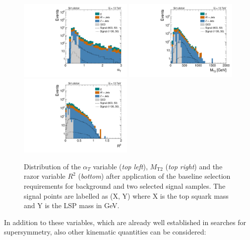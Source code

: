 \begin{figure}[!t]
  \centering
  \begin{minipage}[c]{1.\textwidth}
    \begin{center}
      \includegraphics[width=0.49\textwidth]{figures/Stop_DeltaPhiSelection_AlphaT.pdf}  
      \includegraphics[width=0.49\textwidth]{figures/Stop_DeltaPhiSelection_MT2.pdf} \\
      \includegraphics[width=0.49\textwidth]{figures/Stop_DeltaPhiSelection_Razor_R.pdf}
    \end{center}
  \end{minipage}

  \caption{Distribution of the $\alpha_T$ variable (\textit{top left}), $M_\mathrm{T2}$ (\textit{top right}) and  the razor variable $R^2$ (\textit{bottom}) after application of the baseline selection requirements for background and two selected signal samples. The signal points are labelled as (X, Y) where X is the top squark mass and Y is the LSP mass in GeV.}
  \label{fig:stop_baseline_kin_vars}
\end{figure}
In addition to these variables, which are already well established in searches for supersymmetry, also other kinematic quantities can be considered:
